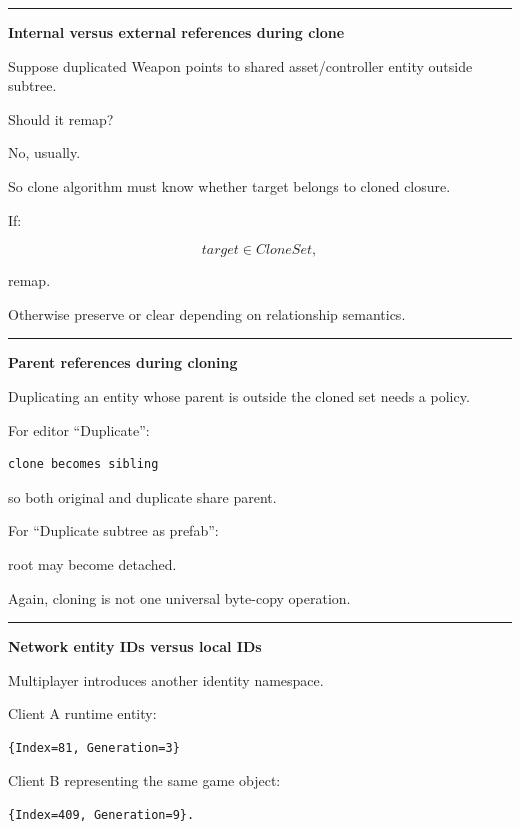 \begin{center}\rule{0.5\linewidth}{0.5pt}\end{center}

\textbf{Internal versus external references during clone}

Suppose duplicated Weapon points to shared asset/controller entity outside subtree.

Should it remap?

No, usually.

So clone algorithm must know whether target belongs to cloned closure.

If:

\[
target\in CloneSet,
\]

remap.

Otherwise preserve or clear depending on relationship semantics.

\begin{center}\rule{0.5\linewidth}{0.5pt}\end{center}

\textbf{Parent references during cloning}

Duplicating an entity whose parent is outside the cloned set needs a policy.

For editor ``Duplicate'':

\begin{verbatim}
clone becomes sibling
\end{verbatim}

so both original and duplicate share parent.

For ``Duplicate subtree as prefab'':

root may become detached.

Again, cloning is not one universal byte-copy operation.

\begin{center}\rule{0.5\linewidth}{0.5pt}\end{center}

\textbf{Network entity IDs versus local IDs}

Multiplayer introduces another identity namespace.

Client A runtime entity:

\begin{verbatim}
{Index=81, Generation=3}
\end{verbatim}

Client B representing the same game object:

\begin{verbatim}
{Index=409, Generation=9}.
\end{verbatim}

